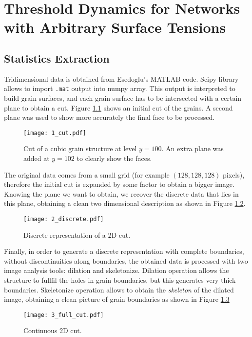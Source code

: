 \chapter{Threshold Dynamics for Networks with Arbitrary Surface Tensions}

\section{Statistics Extraction}
Tridimensional data is obtained from Esedoglu's MATLAB code. Scipy library allows to import \texttt{.mat} output into numpy array. This output is interpreted to build grain surfaces, and each grain surface has to be intersected with a certain plane to obtain a cut. Figure \ref{fig:1_cut} shows an initial cut of the grains. A second plane was used to show more accurately the final face to be processed.

\begin{figure}[h]
    \centering
    \texttt{[image: 1\_cut.pdf]}
    \caption{Cut of a cubic grain structure at level $y=100$. An extra plane was added at $y=102$ to clearly show the faces.}
    \label{fig:1_cut}
\end{figure}

The original data comes from a small grid (for example $(128,128,128)$ pixels), therefore the initial cut is expanded by some factor to obtain a bigger image. Knowing the plane we want to obtain, we recover the discrete data that lies in this plane, obtaining a clean two dimensional description as shown in Figure \ref{fig:2_discrete}.

\begin{figure}[h]
    \centering
    \texttt{[image: 2\_discrete.pdf]}
    \caption{Discrete representation of a 2D cut.}
    \label{fig:2_discrete}
\end{figure}

Finally, in order to generate a discrete representation with complete boundaries, \ie without discontinuities along boundaries, the obtained data is processed with two image analysis tools: dilation and skeletonize. Dilation operation allows the structure to fullfil the holes in grain boundaries, but this generates very thick boundaries. Skeletonize operation allows to obtain the \emph{skeleton} of the dilated image, obtaining a clean picture of grain boundaries as shown in Figure \ref{fig:3_full_cut}

\begin{figure}[h]
    \centering
    \texttt{[image: 3\_full\_cut.pdf]}
    \caption{Continuous 2D cut.}
    \label{fig:3_full_cut}
\end{figure}

